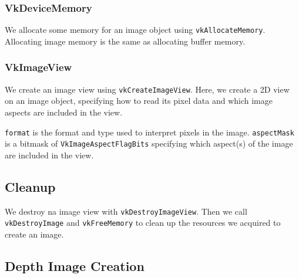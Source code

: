 \subsubsection{VkDeviceMemory}

We allocate some memory for an image object using \texttt{vkAllocateMemory}.
Allocating image memory is the same as allocating buffer memory.

\begin{minipage}{\linewidth}{\noindent}
    
\end{minipage}

\subsubsection{VkImageView}

We create an image view using \texttt{vkCreateImageView}.
Here, we create a 2D view on an image object, specifying
how to read its pixel data and which image aspects
are included in the view.

\begin{minipage}{\linewidth}{\noindent}
    
\end{minipage}

\texttt{format} is the format and type used to interpret pixels in the image.
\texttt{aspectMask} is a bitmask of \texttt{VkImageAspectFlagBits}
specifying which aspect(s) of the image are included in the view.

\subsection{Cleanup}

We destroy na image view with \texttt{vkDestroyImageView}.
Then we call \texttt{vkDestroyImage} and \texttt{vkFreeMemory}
to clean up the resources we acquired to create an image.

\subsection{Depth Image Creation}

